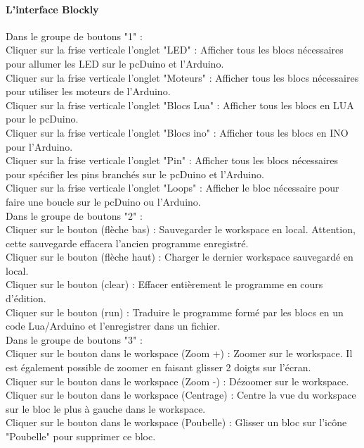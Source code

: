 \documentclass[12pt,francais]{report}
\begin{document}
\paragraph*{L'interface Blockly\\}
\medskip


Dans le groupe de boutons "1" : \\
Cliquer sur la frise verticale l'onglet "LED" : Afficher tous les blocs nécessaires pour allumer les LED sur le pcDuino et l'Arduino.\\
Cliquer sur la frise verticale l'onglet "Moteurs" : Afficher tous les blocs nécessaires pour utiliser les moteurs de l'Arduino.\\
Cliquer sur la frise verticale l'onglet "Blocs Lua" : Afficher tous les blocs en LUA pour le pcDuino.\\
Cliquer sur la frise verticale l'onglet "Blocs ino" : Afficher tous les blocs en INO pour l'Arduino.\\
Cliquer sur la frise verticale l'onglet "Pin" : Afficher tous les blocs nécessaires pour spécifier les pins branchés sur le pcDuino et l'Arduino.\\
Cliquer sur la frise verticale l'onglet "Loops" : Afficher le bloc nécessaire pour faire une boucle sur le pcDuino ou l'Arduino.\\


Dans le groupe de boutons "2" :\\
Cliquer sur le bouton (flèche bas) : Sauvegarder le workspace en local. Attention, cette sauvegarde effacera l'ancien programme enregistré.\\
Cliquer sur le bouton (flèche haut) : Charger le dernier workspace sauvegardé en local.\\
Cliquer sur le bouton (clear) : Effacer entièrement le programme en cours d'édition.\\
Cliquer sur le bouton (run) : Traduire le programme formé par les blocs en un code Lua/Arduino et l'enregistrer dans un fichier.\\


Dans le groupe de boutons "3" :\\
Cliquer sur le bouton dans le workspace (Zoom +) : Zoomer sur le workspace. Il est également possible de zoomer en faisant glisser 2 doigts sur l'écran.\\
Cliquer sur le bouton dans le workspace (Zoom -) : Dézoomer sur le workspace.\\
Cliquer sur le bouton dans le workspace (Centrage) : Centre la vue du workspace sur le bloc le plus à gauche dans le workspace.\\
Cliquer sur le bouton dans le workspace (Poubelle) : Glisser un bloc sur l'icône "Poubelle" pour supprimer ce bloc.\\
\end{document}
